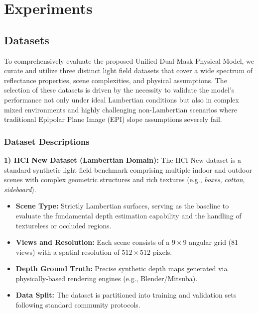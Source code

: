 \documentclass[lettersize,journal]{IEEEtran}
\begin{document}
\section{Experiments}

\subsection{Datasets}

To comprehensively evaluate the proposed Unified Dual-Mask Physical Model, we curate and utilize three distinct light field datasets that cover a wide spectrum of reflectance properties, scene complexities, and physical assumptions. The selection of these datasets is driven by the necessity to validate the model's performance not only under ideal Lambertian conditions but also in complex mixed environments and highly challenging non-Lambertian scenarios where traditional Epipolar Plane Image (EPI) \cite{ref} slope assumptions severely fail. 

\subsubsection{Dataset Descriptions}

\textbf{1) HCI New Dataset (Lambertian Domain):} 
The HCI New dataset \cite{ref} is a standard synthetic light field benchmark comprising multiple indoor and outdoor scenes with complex geometric structures and rich textures (e.g., \textit{boxes}, \textit{cotton}, \textit{sideboard}). 
\begin{itemize}
    \item \textbf{Scene Type:} Strictly Lambertian surfaces, serving as the baseline to evaluate the fundamental depth estimation capability and the handling of textureless or occluded regions.
    \item \textbf{Views and Resolution:} Each scene consists of a $9 \times 9$ angular grid (81 views) with a spatial resolution of $512 \times 512$ pixels.
    \item \textbf{Depth Ground Truth:} Precise synthetic depth maps generated via physically-based rendering engines (e.g., Blender/Mitsuba).
    \item \textbf{Data Split:} The dataset is partitioned into training and validation sets following standard community protocols.
\end{itemize}
\end{document}
